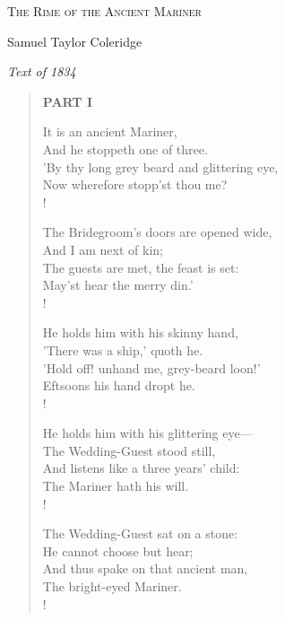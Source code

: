 \documentclass[11pt,twoside]{book}
\begin{document}
\thispagestyle{empty}

\begin{center}
\vspace*{2in}
{\LARGE\scshape The Rime of the Ancient Mariner}

\vspace{0.5in}

{\large Samuel Taylor Coleridge}

\vspace{0.3in}

{\small\itshape Text of 1834}
\end{center}

\clearpage

\setcounter{page}{1}

\begin{verse}

\textbf{\large PART I}

\bigskip

It is an ancient Mariner, \\
And he stoppeth one of three. \\
'By thy long grey beard and glittering eye, \\
Now wherefore stopp'st thou me? \\!

The Bridegroom's doors are opened wide, \\
And I am next of kin; \\
The guests are met, the feast is set: \\
May'st hear the merry din.' \\!

He holds him with his skinny hand, \\
'There was a ship,' quoth he. \\
'Hold off! unhand me, grey-beard loon!' \\
Eftsoons his hand dropt he. \\!

He holds him with his glittering eye— \\
The Wedding-Guest stood still, \\
And listens like a three years' child: \\
The Mariner hath his will. \\!

The Wedding-Guest sat on a stone: \\
He cannot choose but hear; \\
And thus spake on that ancient man, \\
The bright-eyed Mariner. \\!


\end{verse}
\end{document}
